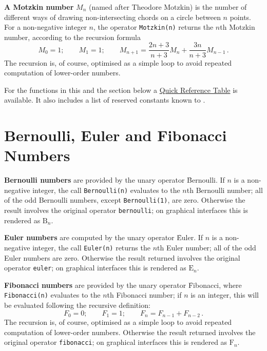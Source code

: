 \hypertarget{operator:MOTZKIN}{}
\textbf{A Motzkin number} $M_{n}$ (named after Theodore Motzkin) is the
number of different ways of drawing non-intersecting chords on a circle between
$n$ points. For a non-negative integer $n$, the operator \texttt{Motzkin(n)}
returns the $n$th Motzkin number, according to the recursion formula
\[
  M_{0} = 1; \qquad M_{1}=1; \qquad
  M_{n+1} = \frac{2n+3}{n+3}M_{n}+ \frac{3n}{n+3}M_{n-1}\,.
\]
The recursion is, of course, optimised as a simple loop to avoid repeated
computation of lower-order numbers.

For the functions in this and the section below
a \hyperlink{SPECFNTAB4}{Quick Reference Table} is available.
It also includes a list of reserved constants known to {\REDUCE}.

\section{Bernoulli, Euler and Fibonacci Numbers}
\hypertarget{operator:BERNOULLI}{}
\textbf{Bernoulli numbers} are provided by the unary operator
\f{Bernoulli}. If $n$ is a non-negative integer, the call \texttt{Bernoulli(n)}
evaluates to the $n$th Bernoulli number; all of the odd Bernoulli numbers,
except \texttt{Bernoulli(1)}, are zero. Otherwise the result involves the
original operator \texttt{bernoulli}; on graphical interfaces this is rendered
as $\mathrm{B}_n$.

\hypertarget{operator:EULER}{}
\textbf{Euler numbers} are computed by the unary operator \f{Euler}.  If $n$
is a non-negative integer, the call \texttt{Euler(n)} returns the $n$th
Euler number; all of the odd Euler numbers are zero.
Otherwise the result returned involves the original operator \texttt{euler};
on graphical interfaces this is rendered
as $\mathrm{E}_n$.

\hypertarget{operator:FIBONACCI}{}
\textbf{Fibonacci numbers} are provided by the unary operator \f{Fibonacci},
where \texttt{Fibonacci(n)} evaluates to the $n$th Fibonacci
number; if $n$ is an integer, this will be evaluated following
the recursive definition:
\[F_0 = 0; \qquad F_1 = 1;\qquad F_n = F_{n-1} + F_{n-2}\,.\]
The recursion is, of course, optimised as a simple loop to avoid repeated
computation of lower-order numbers.
Otherwise the result returned involves the original operator
\texttt{fibonacci}; on graphical interfaces this is rendered
as $\mathrm{F}_n$.


